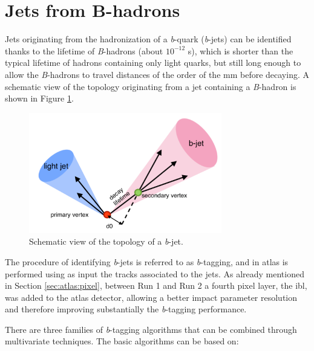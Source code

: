 \section{Jets from B-hadrons}
\label{sec:btagging}

Jets originating from the hadronization of a \textit{b}-quark (\textit{b}-jets) can be identified thanks to the lifetime of \textit{B}-hadrons (about $10^{-12}$ s), which is shorter than the typical lifetime of hadrons containing only light quarks, but still long enough to allow the \textit{B}-hadrons to travel distances of the order of the mm before decaying. A schematic view of the topology originating from a jet containing a \textit{B}-hadron is shown in Figure \ref{fig:btag}. 

\begin{figure}[h]
\begin{center}
\includegraphics[width=0.75\textwidth]{figures/Chap5/Rizzi-Fig5-5.pdf}
\end{center}
\caption[Schematic view of the topology of a \textit{b}-jet.]{Schematic view of the topology of a \textit{b}-jet.}
\label{fig:btag}
\end{figure}

The procedure of identifying \textit{b}-jets is referred to as \textit{b}-tagging, and in \gls{atlas} is performed using as input the tracks associated to the jets. As already mentioned in Section \ref{sec:atlas:pixel}, between Run 1 and Run 2 a fourth pixel layer, the \gls{ibl}, was added to the \gls{atlas} detector, allowing a better impact parameter resolution and therefore improving substantially the \textit{b}-tagging performance. 

There are three families of \textit{b}-tagging algorithms that can be combined through multivariate techniques. The basic algorithms can be based on:

